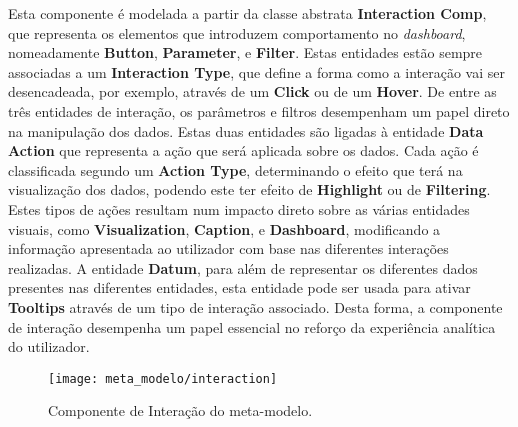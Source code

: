 Esta componente é modelada a partir da classe abstrata \textbf{Interaction Comp}, que representa os elementos que introduzem comportamento no \textit{dashboard}, nomeadamente \textbf{Button}, \textbf{Parameter}, e \textbf{Filter}. Estas entidades estão sempre associadas a um \textbf{Interaction Type}, que define a forma como a interação vai ser desencadeada, por exemplo, através de um \textbf{Click} ou de um \textbf{Hover}. De entre as três entidades de interação, os parâmetros e filtros desempenham um papel direto na manipulação dos dados. Estas duas entidades são ligadas à entidade \textbf{Data Action} que representa a ação que será aplicada sobre os dados. Cada ação é classificada segundo um \textbf{Action Type}, determinando o efeito que terá na visualização dos dados, podendo este ter efeito de \textbf{Highlight} ou de \textbf{Filtering}. Estes tipos de ações resultam num impacto direto sobre as várias entidades visuais, como \textbf{Visualization}, \textbf{Caption}, e \textbf{Dashboard}, modificando a informação apresentada ao utilizador com base nas diferentes interações realizadas. A entidade \textbf{Datum}, para além de representar os diferentes dados presentes nas diferentes entidades, esta entidade pode ser usada para ativar \textbf{Tooltips} através de um tipo de interação associado. Desta forma, a componente de interação desempenha um papel essencial no reforço da experiência analítica do utilizador. 

\begin{figure}[htbp]
  \texttt{[image: meta\_modelo/interaction]}
  \centering
  \caption{Componente de Interação do meta-modelo.}
  \label{fig:interaction}
\end{figure}

